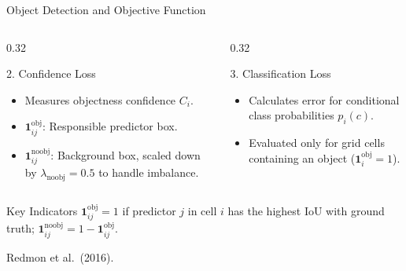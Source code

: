 \documentclass[aspectratio=169, 11pt]{beamer}
\newcommand{\srcline}[1]{%
  \par\vspace{0.25em}%
  {\scriptsize\color{mcMuted}\hfill #1\par}}
\begin{document}
\begin{frame}{Object Detection and Objective Function}
\begin{columns}[t]
        \begin{column}{0.32\textwidth}
            \begin{block}{\small 2. Confidence Loss}
                \tiny
                \begin{itemize}
                    \item Measures objectness confidence $C_i$.
                    \item $\mathbf{1}_{ij}^{\text{obj}}$: Responsible predictor box.
                    \item $\mathbf{1}_{ij}^{\text{noobj}}$: Background box, scaled down by $\lambda_{\text{noobj}} = 0.5$ to handle imbalance.
                \end{itemize}
            \end{block}
        \end{column}

        \begin{column}{0.32\textwidth}
            \begin{block}{\small 3. Classification Loss}
                \tiny
                \begin{itemize}
                    \item Calculates error for conditional class probabilities $p_i(c)$.
                    \item Evaluated only for grid cells containing an object ($\mathbf{1}_{i}^{\text{obj}} = 1$).
                \end{itemize}
            \end{block}
        \end{column}
    \end{columns}

    \vspace{0.2cm}
    \begin{alertblock}{\small Key Indicators}
        \centering \tiny
        $\mathbf{1}_{ij}^{\text{obj}} = 1$ if predictor $j$ in cell $i$ has the highest IoU with ground truth; $\mathbf{1}_{ij}^{\text{noobj}} = 1 - \mathbf{1}_{ij}^{\text{obj}}$.
    \end{alertblock}
     \srcline{Redmon et al.\ (2016).}
\end{frame}
\end{document}
